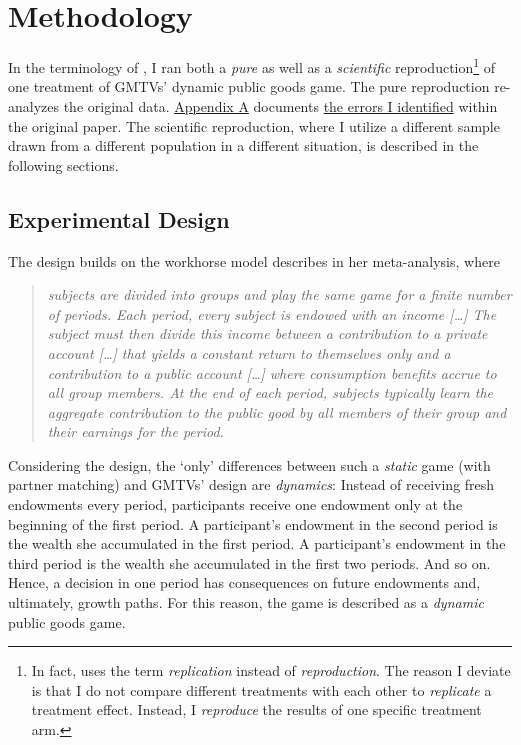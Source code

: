 \documentclass[
  authoryear,
  review,
  3p,
  onecolumn]{elsarticle}
\begin{document}
\hypertarget{sec-methods}{%
\section{Methodology}\label{sec-methods}}

In the terminology of \citet{Hamermesh2007}, I ran both a \emph{pure} as
well as a \emph{scientific} reproduction\footnote{In fact,
  \citet{Hamermesh2007} uses the term \emph{replication} instead of
  \emph{reproduction}. The reason I deviate is that I do not compare
  different treatments with each other to \emph{replicate} a treatment
  effect. Instead, I \emph{reproduce} the results of one specific
  treatment arm.} of one treatment of GMTVs' dynamic public goods game.
The pure reproduction re-analyzes the original data.
\protect\hyperlink{A:-Pure-Replication}{Appendix A} documents
\href{}{the errors I identified} within the original paper. The
scientific reproduction, where I utilize a different sample drawn from a
different population in a different situation, is described in the
following sections.

\hypertarget{sec-design}{%
\subsection{Experimental Design}\label{sec-design}}

The design builds on the workhorse model \citet[p.301]{Zelmer2003}
describes in her meta-analysis, where

\begin{quote}
\emph{subjects are divided into groups and play the same game for a
finite number of periods. Each period, every subject is endowed with an
income {[}\ldots{]} The subject must then divide this income between a
contribution to a private account {[}\ldots{]} that yields a constant
return to themselves only and a contribution to a public account
{[}\ldots{]} where consumption benefits accrue to all group members. At
the end of each period, subjects typically learn the aggregate
contribution to the public good by all members of their group and their
earnings for the period.}
\end{quote}

Considering the design, the `only' differences between such a
\emph{static} game (with partner matching) and GMTVs' design are
\emph{dynamics}: Instead of receiving fresh endowments every period,
participants receive one endowment only at the beginning of the first
period. A participant's endowment in the second period is the wealth she
accumulated in the first period. A participant's endowment in the third
period is the wealth she accumulated in the first two periods. And so
on. Hence, a decision in one period has consequences on future
endowments and, ultimately, growth paths. For this reason, the game is
described as a \emph{dynamic} public goods game.
\end{document}
